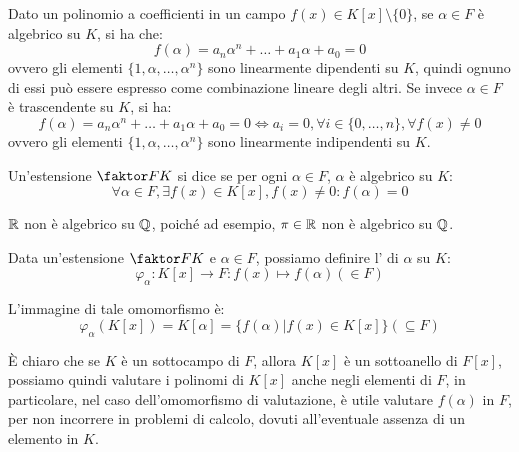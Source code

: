\documentclass[11pt]{scrartcl}
\begin{document}
\begin{remark}
\label{ec:4.6}
Dato un polinomio a coefficienti in un campo $f(x) \in K[x]\setminus\{0\}$, se $\alpha \in F$ è algebrico su $K$, si ha che:
	\[ f(\alpha) = a_n\alpha^n + \ldots + a_1\alpha + a_0 = 0
	\]
ovvero gli elementi $\{1,\alpha,\ldots,\alpha^n\}$ sono linearmente dipendenti su $K$, quindi ognuno di essi può essere espresso come combinazione lineare degli altri. Se invece $\alpha \in F$ è trascendente su $K$, si ha:
	\[ f(\alpha) = a_n\alpha^n + \ldots + a_1\alpha + a_0 = 0 \iff a_i = 0, \forall i \in \{0,\ldots,n\}, \forall f(x) \ne 0
	\]
ovvero gli elementi $\{1,\alpha,\ldots,\alpha^n\}$ sono linearmente indipendenti su $K$.
\end{remark}

\begin{definition}
Un'estensione $\faktor FK$ si dice  se per ogni $\alpha \in F$, $\alpha$ è algebrico su $K$:
	\[ \forall \alpha \in F, \exists f(x) \in K[x], f(x) \ne 0 : f(\alpha) = 0
	\]
\end{definition}

\begin{example}
$\mathbb R$  non è algebrico su $\mathbb Q$, poiché ad esempio, $\pi \in \mathbb R$ non è algebrico su $\mathbb Q$.
\end{example}

\begin{definition}
Data un'estensione $\faktor FK$ e $\alpha \in F$, possiamo definire l' di $\alpha$ su $K$:
	\[ \varphi_\alpha : K[x] \longrightarrow F : f(x) \longmapsto f(\alpha) (\in F)
	\]
\end{definition}
L'immagine di tale omomorfismo è:
	\[ \varphi_\alpha(K[x]) = K[\alpha] = \{f(\alpha) | f(x) \in K[x]\} (\subseteq F)
	\]

\begin{remark}
È chiaro che se $K$ è un sottocampo di $F$, allora $K[x]$ è un sottoanello di $F[x]$, possiamo quindi valutare i polinomi di $K[x]$ anche negli elementi di $F$, in particolare, nel caso dell'omomorfismo di valutazione, è utile valutare $f(\alpha)$ in $F$, per non incorrere in problemi di calcolo, dovuti all'eventuale assenza di un elemento in $K$.
\end{remark}
\end{document}
